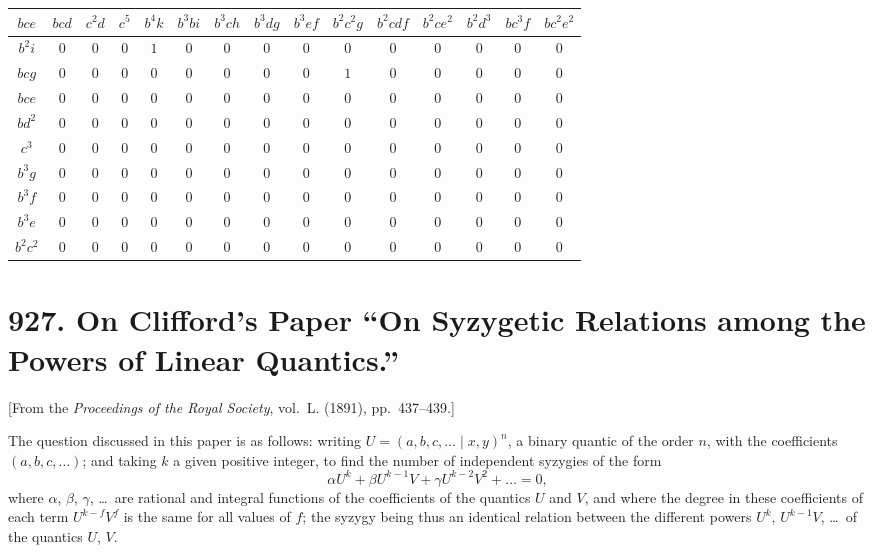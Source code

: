 \documentclass[11pt,a4paper]{book}
\begin{document}
{{{\begin{longtable}{|c|c|c|c|c|c|c|c|c|c|c|c|c|c|c|}
\hline
$bce$ & $bcd$ & $c^2d$ & $c^5$ & $b^4k$ & $b^3bi$ & $b^3ch$ & $b^3dg$ & $b^3ef$ & $b^2c^2g$ & $b^2cdf$ & $b^2ce^2$ & $b^2d^3$ & $bc^3f$ & $bc^2e^2$\\
\hline
\endhead
$b^2i$ & $0$ & $0$ & $0$ & $1$ & $0$ & $0$ & $0$ & $0$ & $0$ & $0$ & $0$ & $0$ & $0$ & $0$\\
$bcg$ & $0$ & $0$ & $0$ & $0$ & $0$ & $0$ & $0$ & $0$ & $1$ & $0$ & $0$ & $0$ & $0$ & $0$\\
$bce$ & $0$ & $0$ & $0$ & $0$ & $0$ & $0$ & $0$ & $0$ & $0$ & $0$ & $0$ & $0$ & $0$ & $0$\\
$bd^2$ & $0$ & $0$ & $0$ & $0$ & $0$ & $0$ & $0$ & $0$ & $0$ & $0$ & $0$ & $0$ & $0$ & $0$\\
$c^3$ & $0$ & $0$ & $0$ & $0$ & $0$ & $0$ & $0$ & $0$ & $0$ & $0$ & $0$ & $0$ & $0$ & $0$\\
$b^3g$ & $0$ & $0$ & $0$ & $0$ & $0$ & $0$ & $0$ & $0$ & $0$ & $0$ & $0$ & $0$ & $0$ & $0$\\
$b^3f$ & $0$ & $0$ & $0$ & $0$ & $0$ & $0$ & $0$ & $0$ & $0$ & $0$ & $0$ & $0$ & $0$ & $0$\\
$b^3e$ & $0$ & $0$ & $0$ & $0$ & $0$ & $0$ & $0$ & $0$ & $0$ & $0$ & $0$ & $0$ & $0$ & $0$\\
$b^2c^2$ & $0$ & $0$ & $0$ & $0$ & $0$ & $0$ & $0$ & $0$ & $0$ & $0$ & $0$ & $0$ & $0$ & $0$\\
\hline
\end{longtable}



\newpage
\section*{927. On Clifford's Paper ``On Syzygetic Relations among the Powers of Linear Quantics.''}

[From the \textit{Proceedings of the Royal Society}, vol.~L. (1891), pp.~437--439.]

\bigskip

The question discussed in this paper is as follows: writing $U = (a, b, c, \ldots \mid x, y)^n$,
a binary quantic of the order $n$, with the coefficients $(a, b, c, \ldots)$; and taking $k$ a given
positive integer, to find the number of independent syzygies of the form
\[
\alpha U^k + \beta U^{k-1}V + \gamma U^{k-2}V^2 + \ldots = 0,
\]
where $\alpha$, $\beta$, $\gamma$, \ldots\ are rational and integral functions of the coefficients of the
quantics $U$ and $V$, and where the degree in these coefficients of each term $U^{k-f}V^f$
is the same for all values of $f$; the syzygy being thus an identical relation between
the different powers $U^k$, $U^{k-1}V$, \ldots\ of the quantics $U$, $V$.

}}}
\end{document}
